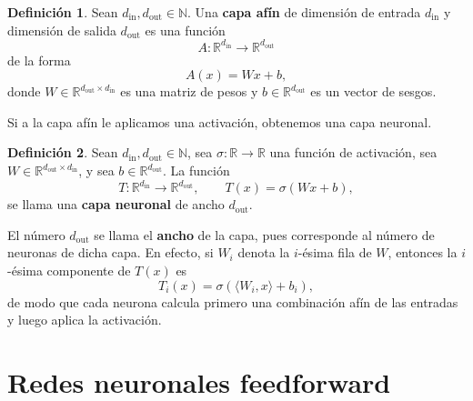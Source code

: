 \documentclass[11pt]{report}
\newenvironment{tcolorbox}[1][]{\par\medskip\noindent\ignorespaces}{\par\medskip}
\theoremstyle{definition}
\newtheorem{definicion}{Definición}[section]
\theoremstyle{plain}
\numberwithin{equation}{section}
\begin{document}
\begin{tcolorbox}[colback=blue!8, colframe=blue!8, boxrule=0pt]
\begin{definicion}
Sean \(d_{\mathrm{in}},d_{\mathrm{out}}\in\mathbb{N}\). Una \textbf{capa afín} de dimensión de entrada \(d_{\mathrm{in}}\) y dimensión de salida \(d_{\mathrm{out}}\) es una función
\begin{equation*}
    A:\mathbb{R}^{d_{\mathrm{in}}}\to\mathbb{R}^{d_{\mathrm{out}}}
\end{equation*}
de la forma
\begin{equation*}
    A(x)=Wx+b,
\end{equation*}
donde \(W\in\mathbb{R}^{d_{\mathrm{out}}\times d_{\mathrm{in}}}\) es una matriz de pesos y \(b\in\mathbb{R}^{d_{\mathrm{out}}}\) es un vector de sesgos.
\end{definicion}
\end{tcolorbox}

Si a la capa afín le aplicamos una activación, obtenemos una capa neuronal.

\begin{tcolorbox}[colback=blue!8, colframe=blue!8, boxrule=0pt]
\begin{definicion}
Sean \(d_{\mathrm{in}},d_{\mathrm{out}}\in\mathbb{N}\), sea \(\sigma:\mathbb{R}\to\mathbb{R}\) una función de activación, sea \(W\in\mathbb{R}^{d_{\mathrm{out}}\times d_{\mathrm{in}}}\), y sea \(b\in\mathbb{R}^{d_{\mathrm{out}}}\). La función
\begin{equation*}
    T:\mathbb{R}^{d_{\mathrm{in}}}\to\mathbb{R}^{d_{\mathrm{out}}},
    \qquad
    T(x)=\sigma(Wx+b),
\end{equation*}
se llama una \textbf{capa neuronal} de ancho \(d_{\mathrm{out}}\).
\end{definicion}
\end{tcolorbox}

El número \(d_{\mathrm{out}}\) se llama el \textbf{ancho} de la capa, pues corresponde al número de neuronas de dicha capa. En efecto, si \(W_i\) denota la \(i\)-ésima fila de \(W\), entonces la \(i\)-ésima componente de \(T(x)\) es
\begin{equation*}
    T_i(x)
    =
    \sigma(\langle W_i,x\rangle+b_i),
\end{equation*}
de modo que cada neurona calcula primero una combinación afín de las entradas y luego aplica la activación.

\section{Redes neuronales feedforward}
\end{document}
